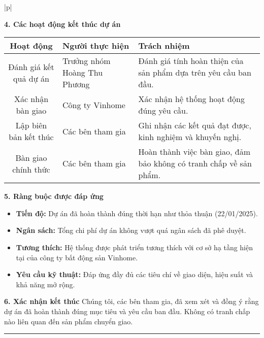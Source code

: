 \begin{longtable}{|p{\textwidth}|}
\begin{minipage}{\textwidth}
        \noindent\textbf{4. Các hoạt động kết thúc dự án}
        \begin{table}[H]
            \centering
            \begin{tabular}{|c|p{}|p{}|}
                \hline
                \textbf{Hoạt động}     & \textbf{Người thực hiện}     & \textbf{Trách nhiệm}                                               \\ \hline
                Đánh giá kết quả dự án & Trưởng nhóm Hoàng Thu Phương & Đánh giá tính hoàn thiện của sản phẩm dựa trên yêu cầu ban đầu.    \\ \hline
                Xác nhận bàn giao      & Công ty Vinhome              & Xác nhận hệ thống hoạt động đúng yêu cầu.                          \\ \hline
                Lập biên bản kết thúc  & Các bên tham gia             & Ghi nhận các kết quả đạt được, kinh nghiệm và khuyến nghị.         \\ \hline
                Bàn giao chính thức    & Các bên tham gia             & Hoàn thành việc bàn giao, đảm bảo không có tranh chấp về sản phẩm. \\ \hline
            \end{tabular}
        \end{table}

        \vspace{0.5cm}

        \noindent\textbf{5. Ràng buộc được đáp ứng}
        \begin{itemize}
            \item \textbf{Tiến độ:} Dự án đã hoàn thành đúng thời hạn như thỏa thuận (22/01/2025).
            \item \textbf{Ngân sách:} Tổng chi phí dự án không vượt quá ngân sách đã phê duyệt.
            \item \textbf{Tương thích:} Hệ thống được phát triển tương thích với cơ sở hạ tầng hiện tại của công ty bất động sản Vinhome.
            \item \textbf{Yêu cầu kỹ thuật:} Đáp ứng đầy đủ các tiêu chí về giao diện, hiệu suất và khả năng mở rộng.
        \end{itemize}

        \vspace{0.5cm}

        \noindent\textbf{6. Xác nhận kết thúc}
        Chúng tôi, các bên tham gia, đã xem xét và đồng ý rằng dự án đã hoàn thành đúng mục tiêu và yêu cầu ban đầu. Không có tranh chấp nào liên quan đến sản phẩm chuyển giao.
        \noindent\rule{\textwidth}{0.4pt}


\end{minipage}
\end{longtable}
